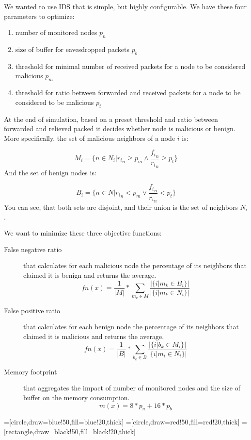 \documentclass[12pt,oneside]{fithesis2}
\begin{document}
We wanted to use IDS that is simple, but highly configurable. 
We have these four parameters to optimize:
\begin{enumerate}
\item number of monitored nodes $p_n$
\item size of buffer for eavesdropped packets $p_b$
\item threshold for minimal number of received packets for a node to be considered malicious $p_m$
\item threshold for ratio between forwarded and received packets for a node to be considered to be malicious $p_t$
\end{enumerate}

At the end of simulation, based on a preset threshold and ratio between forwarded and relieved packed it decides whether node is malicious or benign. More specifically, the set of malicious neighbors of a node $i$ is:

$$ M_i = \{n \in N_i|{r_i}_n \geq p_m \land \frac{{f_i}_n}{{r_i}_n} \geq p_t \} $$
And the set of benign nodes is:

$$B_i = \{n \in N|{r_i}_n < p_m \lor \frac{{f_i}_n}{{r_i}_n} < p_t \} $$
You can see, that both sets are disjoint, and their union is the set of neighbors $N_i$. 

We want to minimize these three objective functions:
\begin{description}
\item[False negative ratio] that calculates for each malicious node the percentage of its neighbors that claimed it is benign and returns the average.
$$fn(x) = \frac{1}{|M|}* \sum\limits_{m_k\in M} \frac{|\{i|m_k \in B_i\}|}{|\{i|m_k \in N_i\}|} $$
\item[False positive ratio] that calculates for each benign node the percentage of its neighbors that claimed it is malicious and returns the average.
$$fn(x) = \frac{1}{|B|}* \sum\limits_{b_k\in B} \frac{|\{i|b_k \in M_i\}|}{|\{i|m_i \in N_i\}|} $$
\item[Memory footprint] that aggregates the impact of number of monitored nodes and the size of buffer on the memory consumption.
$$m(x) = 8*p_n + 16*p_b $$
\end{description}

=[circle,draw=blue!50,fill=blue!20,thick]
=[circle,draw=red!50,fill=red!20,thick]
=[rectangle,draw=black!50,fill=black!20,thick]
\end{document}
